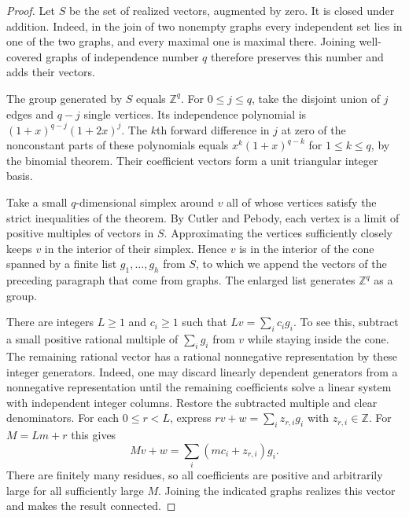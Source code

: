 \documentclass[11pt,a4paper]{article}
\begin{document}
\begin{proof}
Let $S$ be the set of realized vectors, augmented by zero. It is closed
under addition. Indeed, in the join of two nonempty graphs every
independent set lies in one of the two graphs, and every maximal one
is maximal there. Joining well-covered graphs of independence number
$q$ therefore preserves this number and adds their vectors.

The group generated by $S$ equals $\mathbb Z^q$. For $0\le j\le q$,
take the disjoint union of $j$ edges and $q-j$ single vertices. Its
independence polynomial is $(1+x)^{q-j}(1+2x)^j$. The $k$th forward
difference in $j$ at zero of the nonconstant parts of these polynomials
equals $x^k(1+x)^{q-k}$ for $1\le k\le q$, by the binomial theorem.
Their coefficient vectors form a unit triangular integer basis.

Take a small $q$-dimensional simplex around $v$ all of whose vertices
satisfy the strict inequalities of the theorem. By Cutler and Pebody,
each vertex is a limit of positive multiples of vectors in $S$.
Approximating the vertices sufficiently closely keeps $v$ in the
interior of their simplex. Hence $v$ is in the interior of the cone
spanned by a finite list $g_1,\ldots,g_h$ from $S$, to which we append
the vectors of the preceding paragraph that come from graphs. The
enlarged list generates $\mathbb Z^q$ as a group.

There are integers $L\ge1$ and $c_i\ge1$ such that
$Lv=\sum_i c_i g_i$. To see this, subtract a small positive rational
multiple of $\sum_i g_i$ from $v$ while staying inside the cone. The
remaining rational vector has a rational nonnegative representation
by these integer generators. Indeed, one may discard linearly dependent
generators from a nonnegative representation until the remaining
coefficients solve a linear system with independent integer columns.
Restore the subtracted multiple and clear denominators. For each
$0\le r<L$, express $rv+w=\sum_i z_{r,i}g_i$ with $z_{r,i}\in\mathbb Z$.
For $M=Lm+r$ this gives
\[
 Mv+w=\sum_i(mc_i+z_{r,i})g_i.
\]
There are finitely many residues, so all coefficients are positive and
arbitrarily large for all sufficiently large $M$. Joining the indicated
graphs realizes this vector and makes the result connected.
\end{proof}
\end{document}
